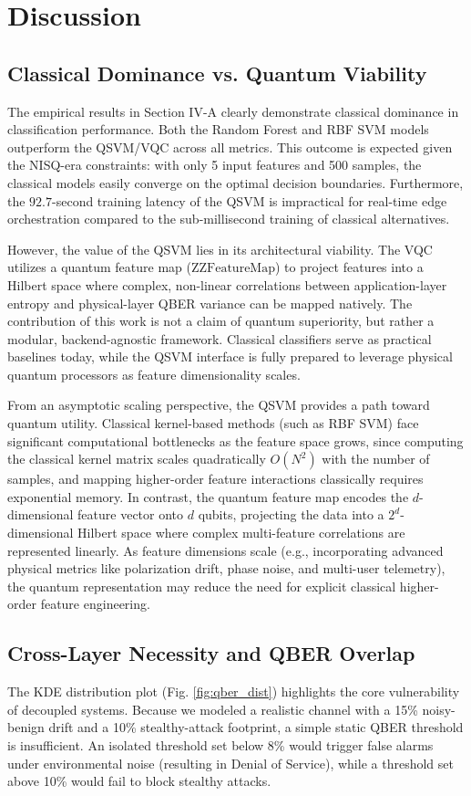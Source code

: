 \documentclass[conference]{IEEEtran}
\begin{document}
\section{Discussion}

\subsection{Classical Dominance vs. Quantum Viability}
The empirical results in Section IV-A clearly demonstrate classical dominance in classification performance. Both the Random Forest and RBF SVM models outperform the QSVM/VQC across all metrics. This outcome is expected given the NISQ-era constraints: with only 5 input features and 500 samples, the classical models easily converge on the optimal decision boundaries. Furthermore, the $92.7$-second training latency of the QSVM is impractical for real-time edge orchestration compared to the sub-millisecond training of classical alternatives.

However, the value of the QSVM lies in its architectural viability. The VQC utilizes a quantum feature map ($\text{ZZFeatureMap}$) to project features into a Hilbert space where complex, non-linear correlations between application-layer entropy and physical-layer QBER variance can be mapped natively. The contribution of this work is not a claim of quantum superiority, but rather a modular, backend-agnostic framework. Classical classifiers serve as practical baselines today, while the QSVM interface is fully prepared to leverage physical quantum processors as feature dimensionality scales.

From an asymptotic scaling perspective, the QSVM provides a path toward quantum utility. Classical kernel-based methods (such as RBF SVM) face significant computational bottlenecks as the feature space grows, since computing the classical kernel matrix scales quadratically $O(N^2)$ with the number of samples, and mapping higher-order feature interactions classically requires exponential memory. In contrast, the quantum feature map encodes the $d$-dimensional feature vector onto $d$ qubits, projecting the data into a $2^d$-dimensional Hilbert space where complex multi-feature correlations are represented linearly. As feature dimensions scale (e.g., incorporating advanced physical metrics like polarization drift, phase noise, and multi-user telemetry), the quantum representation may reduce the need for explicit classical higher-order feature engineering.

\subsection{Cross-Layer Necessity and QBER Overlap}
The KDE distribution plot (Fig. \ref{fig:qber_dist}) highlights the core vulnerability of decoupled systems. Because we modeled a realistic channel with a 15\% noisy-benign drift and a 10\% stealthy-attack footprint, a simple static QBER threshold is insufficient. An isolated threshold set below 8\% would trigger false alarms under environmental noise (resulting in Denial of Service), while a threshold set above 10\% would fail to block stealthy attacks. 
\end{document}
